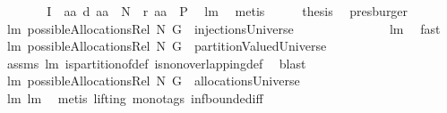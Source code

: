 \begin{isabellebody}
\ \ \isamarkupfalse%
\ \isamarkupfalse%
\ {\isachardoublequoteopen}{\isachardot}{\isachardot}{\isachardot}\ {\isacharequal}\ {\isacharquery}I\ {\isasyminter}\ {\isacharbraceleft}aa{\isachardot}\ {\isacharquery}d\ aa\ {\isasymsubseteq}\ N\ {\isacharampersand}\ {\isacharquery}r\ aa\ {\isasymin}\ {\isacharquery}P{\isacharbraceright}{\isachardoublequoteclose}\ \isamarkupfalse%
\ lm{}{}\ \isamarkupfalse%
\ metis\isanewline
\ \ \isamarkupfalse%
\ \isamarkupfalse%
\ {\isacharquery}thesis\ \isamarkupfalse%
\ presburger\isanewline
{}\isamarkupfalse%
%
\endisatagproof
{\isafoldproof}%
%
\isadelimproof
\isanewline
%
\endisadelimproof
\isanewline
{}\isamarkupfalse%
\ lm{}{}{\isacharcolon}\ {\isachardoublequoteopen}possibleAllocationsRel\ N\ G\ {\isasymsubseteq}\ injectionsUniverse{\isachardoublequoteclose}\ \isanewline
%
\isadelimproof
\ \ \ \ \ \ \ \ \ \ \ \ %
\endisadelimproof
%
\isatagproof
{}\isamarkupfalse%
\ lm{}{}\ \isamarkupfalse%
\ fast%
\endisatagproof
{\isafoldproof}%
%
\isadelimproof
\isanewline
%
\endisadelimproof
\isanewline
{}\isamarkupfalse%
\ lm{}{}{\isacharcolon}\ {\isachardoublequoteopen}possibleAllocationsRel\ N\ G\ {\isasymsubseteq}\ partitionValuedUniverse{\isachardoublequoteclose}\isanewline
%
\isadelimproof
\ \ \ \ \ \ \ \ \ \ \ \ %
\endisadelimproof
%
\isatagproof
{}\isamarkupfalse%
\ assms\ lm{}{}\ is{\isacharunderscore}partition{\isacharunderscore}of{\isacharunderscore}def\ is{\isacharunderscore}non{\isacharunderscore}overlapping{\isacharunderscore}def\ \isamarkupfalse%
\ blast%
\endisatagproof
{\isafoldproof}%
%
\isadelimproof
\isanewline
%
\endisadelimproof
\isanewline
{}\isamarkupfalse%
\ lm{}{}{\isacharcolon}\ {\isachardoublequoteopen}possibleAllocationsRel\ N\ G\ {\isasymsubseteq}\ allocationsUniverse{\isachardoublequoteclose}\ \isanewline
%
\isadelimproof
\ \ \ \ \ \ \ \ \ \ \ \ \ \ \ \ %
\endisadelimproof
%
\isatagproof
{}\isamarkupfalse%
\ lm{}{}\ lm{}{}\ \isamarkupfalse%
\ {\isacharparenleft}metis\ {\isacharparenleft}lifting{\isacharcomma}\ mono{\isacharunderscore}tags{\isacharparenright}\ inf{\isachardot}bounded{\isacharunderscore}iff{\isacharparenright}%
\endisatagproof

\end{isabellebody}
